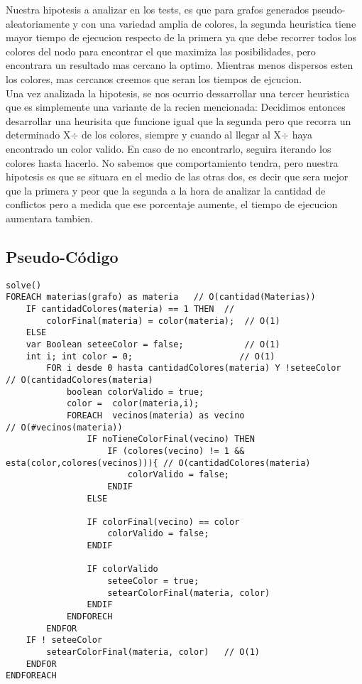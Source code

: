  
Nuestra hipotesis a analizar en los tests, es que para grafos generados pseudo-aleatoriamente y con una variedad amplia de colores, la segunda heuristica tiene mayor tiempo de ejecucion respecto de la primera ya que debe recorrer todos los colores del nodo para encontrar el que maximiza las posibilidades, pero encontrara un resultado mas cercano la optimo. Mientras menos dispersos esten los colores, mas cercanos creemos que seran los tiempos de ejcucion. \\

Una vez analizada la hipotesis, se nos ocurrio dessarrollar una tercer heuristica que es simplemente una variante de la recien mencionada:
Decidimos entonces desarrollar una heurisita que funcione igual que la segunda pero que recorra un determinado X$\div$ de los colores, siempre y cuando al llegar al X$\div$ haya encontrado un color valido. En caso de no encontrarlo, seguira iterando los colores hasta hacerlo. No sabemos que comportamiento tendra, pero nuestra hipotesis es que se situara en el medio de las otras dos, es decir que sera mejor que la primera y peor que la segunda a la hora de analizar la cantidad de conflictos pero a medida que ese porcentaje aumente, el tiempo de ejecucion aumentara tambien.

\subsection{Pseudo-C\'odigo}

\begin{verbatim}
solve()
FOREACH materias(grafo) as materia   // O(cantidad(Materias))
    IF cantidadColores(materia) == 1 THEN  // 
        colorFinal(materia) = color(materia);  // O(1)
    ELSE
    var Boolean seteeColor = false;            // O(1)
    int i; int color = 0;                     // O(1)
        FOR i desde 0 hasta cantidadColores(materia) Y !seteeColor   // O(cantidadColores(materia)
            boolean colorValido = true;
            color =  color(materia,i);
            FOREACH  vecinos(materia) as vecino                      // O(#vecinos(materia))
                IF noTieneColorFinal(vecino) THEN
                    IF (colores(vecino) != 1 && esta(color,colores(vecinos))){ // O(cantidadColores(materia)
                        colorValido = false;
                    ENDIF
                ELSE

                IF colorFinal(vecino) == color
                    colorValido = false;
                ENDIF

                IF colorValido 
                    seteeColor = true;
                    setearColorFinal(materia, color)
                ENDIF
            ENDFORECH
        ENDFOR
    IF ! seteeColor
        setearColorFinal(materia, color)   // O(1)
    ENDFOR
ENDFOREACH
\end{verbatim}

